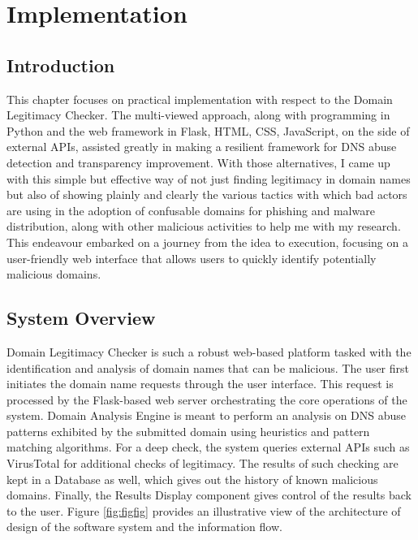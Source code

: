 \chapter{Implementation}

\section{Introduction} 

This chapter focuses on practical implementation with respect to the Domain Legitimacy Checker. The multi-viewed approach, along with programming in Python and the web framework in Flask, HTML, CSS, JavaScript, on the side of external APIs, assisted greatly in making a resilient framework for DNS abuse detection and transparency improvement. With those alternatives, I came up with this simple but effective way of not just finding legitimacy in domain names but also of showing plainly and clearly the various tactics with which bad actors are using in the adoption of confusable domains for phishing and malware distribution, along with other malicious activities to help me with my research. This endeavour embarked on a journey from the idea to execution, focusing on a user-friendly web interface that allows users to quickly identify potentially malicious domains. 

\section{System Overview}

Domain Legitimacy Checker is such a robust web-based platform tasked with the identification and analysis of domain names that can be malicious. The user first initiates the domain name requests through the user interface. This request is processed by the Flask-based web server orchestrating the core operations of the system. Domain Analysis Engine is meant to perform an analysis on DNS abuse patterns exhibited by the submitted domain using heuristics and pattern matching algorithms. For a deep check, the system queries external APIs such as VirusTotal for additional checks of legitimacy. The results of such checking are kept in a Database as well, which gives out the history of known malicious domains. Finally, the Results Display component gives control of the results back to the user. Figure \ref{fig:figfig} provides an illustrative view of the architecture of design of the software system and the information flow.


